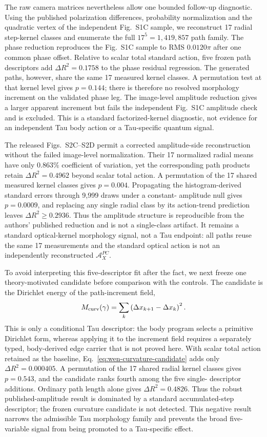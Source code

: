 The raw camera matrices nevertheless allow one bounded follow-up diagnostic.
Using the published polarization differences, probability normalization and
the quadratic vertex of the independent Fig.~S1C sample, we reconstruct 17
radial step-kernel classes and enumerate the full $17^5=1{,}419{,}857$ path
family.  The phase reduction reproduces the Fig.~S1C sample to RMS
$0.0120\pi$ after one common phase offset.  Relative to scalar total standard
action, five frozen path descriptors add $\Delta R^2=0.1758$ to the phase
residual regression.  The generated paths, however, share the same 17 measured
kernel classes.  A permutation test at that kernel level gives $p=0.144$;
there is therefore no resolved morphology increment on the validated phase
leg.  The image-level amplitude reduction gives a larger apparent increment
but fails the independent Fig.~S1C amplitude check and is excluded.  This is a
standard factorized-kernel diagnostic, not evidence for an independent Tau
body action or a Tau-specific quantum signal.

The released Figs.~S2C--S2D permit a corrected amplitude-side reconstruction
without the failed image-level normalization. Their 17 normalized radial
means have only $0.863\%$ coefficient of variation, yet the corresponding path
products retain $\Delta R^2=0.4962$ beyond scalar total action. A permutation
of the 17 shared measured kernel classes gives $p=0.004$. Propagating the
histogram-derived standard errors through 9,999 draws under a constant-
amplitude null gives $p=0.0009$, and replacing any single radial class by its
action-trend prediction leaves $\Delta R^2\geq0.2936$. Thus the amplitude
structure is reproducible from the authors' published reduction and is not a
single-class artifact. It remains a standard optical-kernel morphology signal,
not a Tau endpoint: all paths reuse the same 17 measurements and the standard
optical action is not an independently reconstructed $\mathcal A_X^{PC}$.

To avoid interpreting this five-descriptor fit after the fact, we next freeze
one theory-motivated candidate before comparison with the controls. The
candidate is the Dirichlet energy of the path-increment field,
\begin{equation}
 M_{\rm curv}(\gamma)
 =\sum_k\left(\Delta x_{k+1}-\Delta x_k\right)^2.
 \label{eq:wen-curvature-candidate}
\end{equation}
This is only a conditional Tau descriptor: the body program selects a
primitive Dirichlet form, whereas applying it to the increment field requires
a separately typed, body-derived edge carrier that is not proved here. With
scalar total action retained as the baseline,
Eq.~\eqref{eq:wen-curvature-candidate} adds only
$\Delta R^2=0.000405$. A permutation of the 17 shared radial kernel classes
gives $p=0.543$, and the candidate ranks fourth among the five single-
descriptor additions. Ordinary path length alone gives
$\Delta R^2=0.4826$. Thus the robust published-amplitude result is dominated
by a standard accumulated-step descriptor; the frozen curvature candidate is
not detected. This negative result narrows the admissible Tau morphology
family and prevents the broad five-variable signal from being promoted to a
Tau-specific effect.

